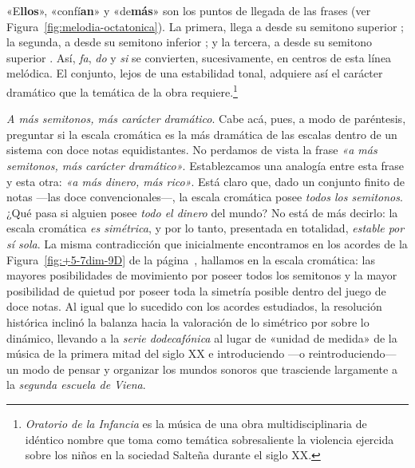 \documentclass[a4paper,11pt]{article}
\begin{document}
\begin{multicols}{2}
«E\textbf{llos}», «confí\textbf{an}» y «de\textbf{más}» son los puntos de llegada de las frases (ver Figura~\ref{fig:melodia-octatonica}). La primera, llega a  desde su semitono superior \hbox{;} la segunda, a  desde su semitono inferior \hbox{;} y la tercera, a  desde su semitono superior \hbox{.} Así, \emph{fa}, \emph{do} y \emph{si} se convierten, sucesivamente, en centros de esta línea melódica. El conjunto, lejos de una estabilidad tonal, adquiere así el carácter dramático que la temática de la obra requiere.\footnote{\emph{Oratorio de la Infancia} es la música de una obra multidisciplinaria de idéntico nombre que toma como temática sobresaliente la violencia ejercida sobre los niños en la sociedad Salteña durante el siglo XX.}

\emph{A más semitonos, más carácter dramático}. Cabe acá, pues, a modo de paréntesis, preguntar si la escala cromática es la más dramática de las escalas dentro de un sistema con doce notas equidistantes. No perdamos de vista la frase \emph{«a más semitonos, más carácter dramático»}. Establezcamos una analogía entre esta frase y esta otra: \emph{«a más dinero, más rico»}. Está claro que, dado un conjunto finito de notas ---las doce convencionales---, la escala cromática posee \emph{todos los semitonos}. ¿Qué pasa si alguien posee \emph{todo el dinero} del mundo? No está de más decirlo: la escala cromática \emph{es simétrica}, y por lo tanto, presentada en totalidad, \emph{estable por sí sola}. La misma contradicción que inicialmente encontramos en los acordes de la Figura~\ref{fig:+5-7dim-9D} de la página~\pageref{fig:+5-7dim-9D}, hallamos en la escala cromática: las mayores posibilidades de movimiento por poseer todos los semitonos y la mayor posibilidad de quietud por poseer toda la simetría posible dentro del juego de doce notas. Al igual que lo sucedido con los acordes estudiados, la resolución histórica inclinó la balanza hacia la valoración de lo simétrico por sobre lo dinámico, llevando a la \emph{serie dodecafónica} al lugar de «unidad de medida» de la música de la primera mitad del siglo XX e introduciendo ---o reintroduciendo--- un modo de pensar y organizar los mundos sonoros que trasciende largamente a la \emph{segunda escuela de Viena}.
\end{multicols}
\end{document}
